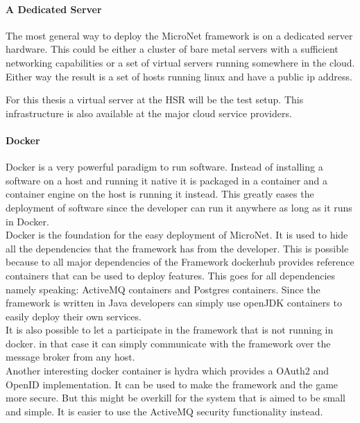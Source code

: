 \paragraph{A Dedicated Server}

The most general way to deploy the MicroNet framework is on a dedicated server
hardware. This could be either a cluster of bare metal servers with a sufficient
networking capabilities or a set of virtual servers running somewhere in the
cloud. Either way the result is a set of hosts running linux and have a public
ip address.

For this thesis a virtual server at the HSR will be the test setup. This
infrastructure is also available at the major cloud service providers.

\paragraph{Docker}

Docker is a very powerful paradigm to run software. Instead of installing a
software on a host and running it native it is packaged in a container and a
container engine on the host is running it instead. This greatly eases the
deployment of software since the developer can run it anywhere as long as it
runs in Docker.\\

Docker is the foundation for the easy deployment of MicroNet. It is used to hide
all the dependencies that the framework has from the developer. This is possible
because to all major dependencies of the Framework dockerhub provides reference
containers that can be used to deploy features. This goes for all dependencies
namely speaking: ActiveMQ containers and Postgres containers. Since the
framework is written in Java developers can simply use openJDK containers to
easily deploy their own services.\\

It is also possible to let a \ms{} participate in the framework that is not
running in docker. in that case it can simply communicate with the framework
over the message broker from any host.\\

Another interesting docker container is hydra which provides a OAuth2 and
OpenID implementation. It can be used to make the framework and the game more
secure. But this might be overkill for the system that is aimed to be small and
simple. It is easier to use the ActiveMQ security functionality instead.\\


